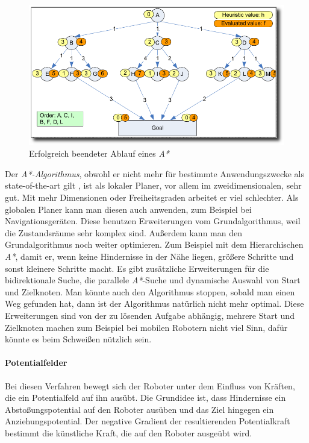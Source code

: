 \begin{figure}[h]
\center
\includegraphics[scale=0.3]{graphics/AStar.png}
\caption{\label{fig:a*} Erfolgreich beendeter Ablauf eines \textit{A*}  \citep{innoKonz}}
\end{figure}

Der \textit{A*-Algorithmus}, obwohl er nicht mehr für bestimmte Anwendungszwecke als state-of-the-art gilt \citep{innoKonz}, ist als lokaler Planer, vor allem im zweidimensionalen, sehr gut.
Mit mehr Dimensionen oder Freiheitsgraden arbeitet er viel schlechter.
Als globalen Planer kann man diesen auch anwenden, zum Beispiel bei Navigationsgeräten.
Diese benutzen Erweiterungen vom Grundalgorithmus, weil die Zustandsräume sehr komplex sind.
Außerdem kann man den Grundalgorithmus noch weiter optimieren.
Zum Beispiel mit dem Hierarchischen \textit{A*}, damit er, wenn keine Hindernisse in der Nähe liegen, größere Schritte und sonst kleinere Schritte macht.
Es gibt zusätzliche Erweiterungen für die bidirektionale Suche, die parallele \textit{A*}-Suche und dynamische Auswahl von Start und Zielknoten.
Man könnte auch den Algorithmus stoppen, sobald man einen Weg gefunden hat, dann ist der Algorithmus natürlich nicht mehr optimal.
Diese Erweiterungen sind von der zu lösenden Aufgabe abhängig, mehrere Start und Zielknoten machen zum Beispiel bei mobilen Robotern nicht viel Sinn, dafür könnte es beim Schweißen nützlich sein.

\paragraph{Potentialfelder}

Bei diesen Verfahren bewegt sich der Roboter unter dem Einfluss von Kräften, die ein Potentialfeld auf ihn ausübt.
Die Grundidee ist, dass Hindernisse ein Abstoßungspotential auf den Roboter ausüben und das Ziel hingegen ein Anziehungspotential.
Der negative Gradient der resultierenden Potentialkraft bestimmt die künstliche Kraft, die auf den Roboter ausgeübt wird.

